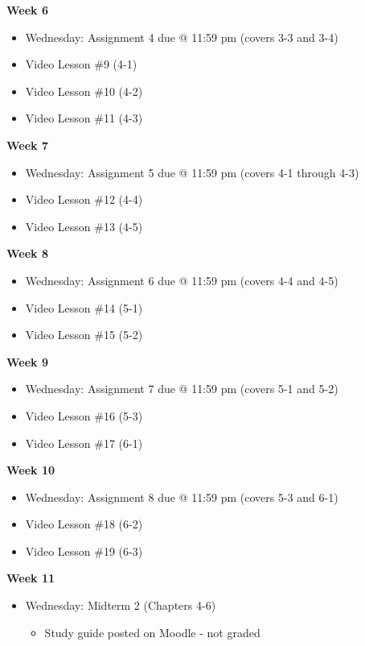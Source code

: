 \documentclass[12pt]{letter}
\newcommand{\?}{\stackrel{?}{=}}
\begin{document}
	\textbf{Week 6} \begin{itemize} \vspace{-12pt}
		\item Wednesday: Assignment 4 due @ 11:59 pm (covers 3-3 and 3-4)
		\item Video Lesson \#9 (4-1)
		\item Video Lesson \#10 (4-2)
		\item Video Lesson \#11 (4-3)
	\end{itemize}

	\textbf{Week 7} \begin{itemize} \vspace{-12pt}
		\item Wednesday: Assignment 5 due @ 11:59 pm (covers 4-1 through 4-3)
		\item Video Lesson \#12 (4-4)
		\item Video Lesson \#13 (4-5)
	\end{itemize}

	\textbf{Week 8} \begin{itemize} \vspace{-12pt}
		\item Wednesday: Assignment 6 due @ 11:59 pm (covers 4-4 and 4-5)
		\item Video Lesson \#14 (5-1)
		\item Video Lesson \#15 (5-2)
	\end{itemize}

	\textbf{Week 9} \begin{itemize} \vspace{-12pt}
		\item Wednesday: Assignment 7 due @ 11:59 pm (covers 5-1 and 5-2)
		\item Video Lesson \#16 (5-3)
		\item Video Lesson \#17 (6-1)
	\end{itemize}
	
	\textbf{Week 10} \begin{itemize} \vspace{-12pt}
		\item Wednesday: Assignment 8 due @ 11:59 pm (covers 5-3 and 6-1)
		\item Video Lesson \#18 (6-2)
		\item Video Lesson \#19 (6-3)
	\end{itemize}

	\textbf{Week 11} \begin{itemize} \vspace{-12pt}
		\item Wednesday: Midterm 2 (Chapters 4-6) \begin{itemize}
			\item Study guide posted on Moodle - not graded
		\end{itemize}
	\end{itemize}
	
\end{document}
